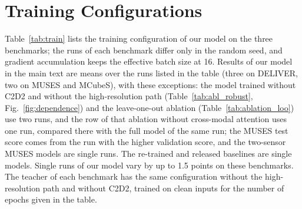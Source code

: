 \section{Training Configurations}
\label{app:train}
Table~\ref{tab:train} lists the training configuration of our model on the three benchmarks; the runs of each benchmark differ only in the random seed, and gradient accumulation keeps the effective batch size at 16. Results of our model in the main text are means over the runs listed in the table (three on DELIVER, two on MUSES and MCubeS), with these exceptions: the model trained without C2D2 and without the high-resolution path (Table~\ref{tab:abl_robust}, Fig.~\ref{fig:dependence}) and the leave-one-out ablation (Table~\ref{tab:ablation_loo}) use two runs, and the row of that ablation without cross-modal attention uses one run, compared there with the full model of the same run; the MUSES test score comes from the run with the higher validation score, and the two-sensor MUSES models are single runs. The re-trained and released baselines are single models. Single runs of our model vary by up to 1.5 points on these benchmarks. The teacher of each benchmark has the same configuration without the high-resolution path and without C2D2, trained on clean inputs for the number of epochs given in the table.

